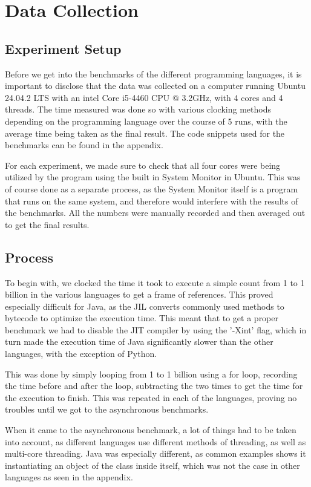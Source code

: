 \documentclass[12pt,a4paper]{article}
\begin{document}
\section{Data Collection}

\subsection{Experiment Setup}

Before we get into the benchmarks of the different programming languages, it is important to disclose that the data was collected on a computer running Ubuntu 24.04.2 LTS with an intel Core i5-4460 CPU @ 3.2GHz, with 4 cores and 4 threads. The time measured was done so with various clocking methods depending on the programming language over the course of 5 runs, with the average time being taken as the final result. The code snippets used for the benchmarks can be found in the appendix.

For each experiment, we made sure to check that all four cores were being utilized by the program using the built in System Monitor in Ubuntu. This was of course done as a separate process, as the System Monitor itself is a program that runs on the same system, and therefore would interfere with the results of the benchmarks. All the numbers were manually recorded and then averaged out to get the final results. 

\subsection{Process}

To begin with, we clocked the time it took to execute a simple count from 1 to 1 billion in the various languages to get a frame of references. This proved especially difficult for Java, as the JIL converts commonly used methods to bytecode to optimize the execution time. This meant that to get a proper benchmark we had to disable the JIT compiler by using the '-Xint' flag, which in turn made the execution time of Java significantly slower than the other languages, with the exception of Python.

This was done by simply looping from 1 to 1 billion using a for loop, recording the time before and after the loop, subtracting the two times to get the time for the execution to finish. This was repeated in each of the languages, proving no troubles until we got to the asynchronous benchmarks.

When it came to the asynchronous benchmark, a lot of things had to be taken into account, as different languages use different methods of threading, as well as multi-core threading. Java was especially different, as common examples shows it instantiating an object of the class inside itself, which was not the case in other languages as seen in the appendix. 
\end{document}
